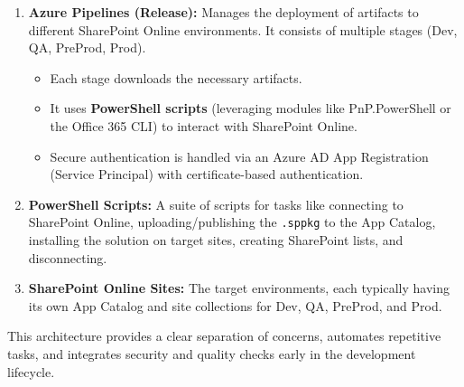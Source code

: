 \begin{enumerate}
    \item \textbf{Azure Pipelines (Release):} Manages the deployment of artifacts to different SharePoint Online environments. It consists of multiple stages (Dev, QA, PreProd, Prod).
    \begin{itemize}
        \item Each stage downloads the necessary artifacts.
        \item It uses \textbf{PowerShell scripts} (leveraging modules like PnP.PowerShell or the Office 365 CLI) to interact with SharePoint Online.
        \item Secure authentication is handled via an Azure AD App Registration (Service Principal) with certificate-based authentication.
    \end{itemize}
    \item \textbf{PowerShell Scripts:} A suite of scripts for tasks like connecting to SharePoint Online, uploading/publishing the \texttt{.sppkg} to the App Catalog, installing the solution on target sites, creating SharePoint lists, and disconnecting.
    \item \textbf{SharePoint Online Sites:} The target environments, each typically having its own App Catalog and site collections for Dev, QA, PreProd, and Prod.
\end{enumerate}

This architecture provides a clear separation of concerns, automates repetitive tasks, and integrates security and quality checks early in the development lifecycle.